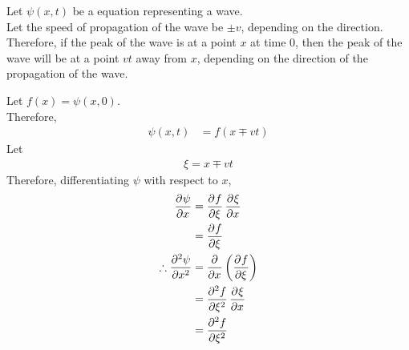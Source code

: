 \documentclass[fleqn, a4paper, 12pt, twoside]{article}
\theoremstyle{definition}
\theoremstyle{theorem}
\begin{document}
Let $\psi(x,t)$ be a equation representing a wave.\\
Let the speed of propagation of the wave be $\pm v$, depending on the direction.\\
Therefore, if the peak of the wave is at a point $x$ at time $0$, then the peak of the wave will be at a point $v t$ away from $x$, depending on the direction of the propagation of the wave.\\
\begin{figure}[H]
\end{figure}
Let $f(x) = \psi(x,0)$.\\
Therefore,
\begin{align*}
	\psi(x,t) &= f(x \mp v t)
\end{align*}
Let
\begin{align*}
	\xi = x \mp v t
\end{align*}
Therefore, differentiating $\psi$ with respect to $x$,
\begin{align*}
	\dpd{\psi}{x} &= \dpd{f}{\xi} \dpd{\xi}{x}\\
	&= \dpd{f}{\xi}\\
	\therefore \dpd[2]{\psi}{x} &= \dpd{}{x}\left( \dpd{f}{\xi} \right)\\
	&= \dpd[2]{f}{\xi} \dpd{\xi}{x}\\
	&= \dpd[2]{f}{\xi}
\end{align*}
\end{document}
